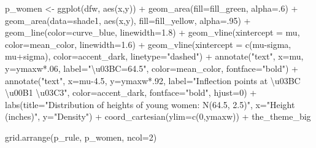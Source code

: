 \documentclass[
  letterpaper,
  DIV=11,
  numbers=noendperiod]{scrreprt}
\newenvironment{Shaded}{\begin{snugshade}}{\end{snugshade}}
\newcommand{\AttributeTok}[1]{\textcolor[rgb]{0.40,0.45,0.13}{#1}}
\newcommand{\DecValTok}[1]{\textcolor[rgb]{0.68,0.00,0.00}{#1}}
\newcommand{\FloatTok}[1]{\textcolor[rgb]{0.68,0.00,0.00}{#1}}
\newcommand{\FunctionTok}[1]{\textcolor[rgb]{0.28,0.35,0.67}{#1}}
\newcommand{\NormalTok}[1]{\textcolor[rgb]{0.00,0.23,0.31}{#1}}
\newcommand{\OtherTok}[1]{\textcolor[rgb]{0.00,0.23,0.31}{#1}}
\newcommand{\SpecialCharTok}[1]{\textcolor[rgb]{0.37,0.37,0.37}{#1}}
\newcommand{\StringTok}[1]{\textcolor[rgb]{0.13,0.47,0.30}{#1}}
\begin{document}
\begin{Shaded}
\begin{Highlighting}[]
\NormalTok{p\_women }\OtherTok{\textless{}{-}} \FunctionTok{ggplot}\NormalTok{(dfw, }\FunctionTok{aes}\NormalTok{(x,y)) }\SpecialCharTok{+}
  \FunctionTok{geom\_area}\NormalTok{(}\AttributeTok{fill=}\NormalTok{fill\_green, }\AttributeTok{alpha=}\NormalTok{.}\DecValTok{6}\NormalTok{) }\SpecialCharTok{+}
  \FunctionTok{geom\_area}\NormalTok{(}\AttributeTok{data=}\NormalTok{shade1, }\FunctionTok{aes}\NormalTok{(x,y), }\AttributeTok{fill=}\NormalTok{fill\_yellow, }\AttributeTok{alpha=}\NormalTok{.}\DecValTok{95}\NormalTok{) }\SpecialCharTok{+}
  \FunctionTok{geom\_line}\NormalTok{(}\AttributeTok{color=}\NormalTok{curve\_blue, }\AttributeTok{linewidth=}\FloatTok{1.8}\NormalTok{) }\SpecialCharTok{+}
  \FunctionTok{geom\_vline}\NormalTok{(}\AttributeTok{xintercept =}\NormalTok{ mu, }\AttributeTok{color=}\NormalTok{mean\_color, }\AttributeTok{linewidth=}\FloatTok{1.6}\NormalTok{) }\SpecialCharTok{+}
  \FunctionTok{geom\_vline}\NormalTok{(}\AttributeTok{xintercept =} \FunctionTok{c}\NormalTok{(mu}\SpecialCharTok{{-}}\NormalTok{sigma, mu}\SpecialCharTok{+}\NormalTok{sigma), }\AttributeTok{color=}\NormalTok{accent\_dark, }\AttributeTok{linetype=}\StringTok{"dashed"}\NormalTok{) }\SpecialCharTok{+}
  \FunctionTok{annotate}\NormalTok{(}\StringTok{"text"}\NormalTok{, }\AttributeTok{x=}\NormalTok{mu, }\AttributeTok{y=}\NormalTok{ymaxw}\SpecialCharTok{*}\NormalTok{.}\DecValTok{06}\NormalTok{, }\AttributeTok{label=}\StringTok{"\textbackslash{}u03BC=64.5"}\NormalTok{, }\AttributeTok{color=}\NormalTok{mean\_color, }\AttributeTok{fontface=}\StringTok{"bold"}\NormalTok{) }\SpecialCharTok{+}
  \FunctionTok{annotate}\NormalTok{(}\StringTok{"text"}\NormalTok{, }\AttributeTok{x=}\NormalTok{mu}\FloatTok{{-}4.5}\NormalTok{, }\AttributeTok{y=}\NormalTok{ymaxw}\SpecialCharTok{*}\NormalTok{.}\DecValTok{92}\NormalTok{, }\AttributeTok{label=}\StringTok{"Inflection points at \textbackslash{}u03BC \textbackslash{}u00B1 \textbackslash{}u03C3"}\NormalTok{, }\AttributeTok{color=}\NormalTok{accent\_dark, }\AttributeTok{fontface=}\StringTok{"bold"}\NormalTok{, }\AttributeTok{hjust=}\DecValTok{0}\NormalTok{) }\SpecialCharTok{+}
  \FunctionTok{labs}\NormalTok{(}\AttributeTok{title=}\StringTok{"Distribution of heights of young women: N(64.5, 2.5)"}\NormalTok{, }\AttributeTok{x=}\StringTok{"Height (inches)"}\NormalTok{, }\AttributeTok{y=}\StringTok{"Density"}\NormalTok{) }\SpecialCharTok{+}
  \FunctionTok{coord\_cartesian}\NormalTok{(}\AttributeTok{ylim=}\FunctionTok{c}\NormalTok{(}\DecValTok{0}\NormalTok{,ymaxw)) }\SpecialCharTok{+}
\NormalTok{  the\_theme\_big}

\FunctionTok{grid.arrange}\NormalTok{(p\_rule, p\_women, }\AttributeTok{ncol=}\DecValTok{2}\NormalTok{)}
\end{Highlighting}
\end{Shaded}
\end{document}
